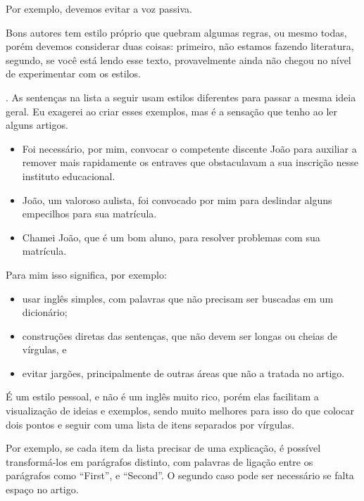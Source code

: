 \documentclass{article}
\begin{document}
 Por exemplo, devemos evitar  a voz passiva.

Bons autores tem estilo próprio que quebram algumas regras, ou mesmo todas, porém devemos considerar duas coisas: primeiro, não estamos fazendo literatura, segundo, se você está lendo esse texto, provavelmente ainda não chegou no nível de experimentar com os estilos.

. As sentenças na lista a seguir usam estilos diferentes para passar a mesma ideia geral. Eu exagerei ao criar esses exemplos, mas é a sensação que tenho ao ler alguns artigos.
\begin{itemize}
    \item Foi necessário, por mim, convocar o competente discente João para auxiliar a remover mais rapidamente os entraves que obstaculavam a sua inscrição nesse instituto educacional.
    \item João, um valoroso aulista, foi convocado por mim para deslindar alguns empecilhos para sua matrícula.
    \item Chamei João, que é um bom aluno, para resolver problemas com sua matrícula.
\end{itemize}



 Para mim isso significa, por exemplo:
\begin{itemize}
    \item usar inglês simples, com palavras que não precisam ser buscadas em um dicionário;
    \item construções diretas das sentenças, que não devem ser longas ou cheias de vírgulas, e
    \item evitar jargões, principalmente de outras áreas que não a tratada no artigo.
\end{itemize}
 
 É um estilo pessoal, e não é um inglês muito rico, porém elas facilitam a visualização de ideias e exemplos, sendo muito melhores para isso do que colocar dois pontos e seguir com uma lista de itens separados por vírgulas. 
 
  Por exemplo, se cada item da lista precisar de uma explicação, é possível transformá-los em parágrafos distinto, com palavras de ligação entre os parágrafos como ``First'', e ``Second''. O segundo caso pode ser necessário se falta espaço no artigo.
 
\end{document}
